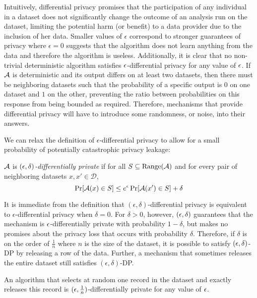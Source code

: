 Intuitively, differential privacy promises that the participation of any individual in a dataset does not significantly change the outcome of an analysis run on the dataset, limiting the potential harm (or benefit) to a data provider due to the inclusion of her data. Smaller values of $\epsilon$ correspond to stronger guarantees of privacy where $\epsilon = 0$ suggests that the algorithm does not learn anything from the data and therefore the algorithm is useless. Additionally, it is clear that no non-trivial deterministic algorithm satisfies $\epsilon$-differential privacy for any value of $\epsilon$. If $\mathcal{A}$ is deterministic and its output differs on at least two datasets, then there must be neighboring datasets such that the probability of a specific output is $0$ on one dataset and $1$ on the other, preventing the ratio between probabilities on this response from being bounded as required. Therefore, mechanisms that provide differential privacy will have to introduce some randomness, or noise, into their answers.

We can relax the definition of $\epsilon$-differential privacy to allow for a small probability of potentially catastrophic privacy leakage:

\begin{definition}
$\mathcal{A}$ is \emph{$(\epsilon, \delta)$-differentially private} if for all $S \subseteq \text{Range}(\mathcal{A})$ and for every pair of neighboring datasets $x, x' \in \mathcal{D}$,
\begin{equation*}
\Pr[\mathcal{A}(x) \in S] \leq e^{\epsilon} \Pr[\mathcal{A}(x') \in S] + \delta
\end{equation*}
\end{definition}

It is immediate from the definition that $(\epsilon, \delta)$-differential privacy is equivalent to $\epsilon$-differential privacy  when $\delta = 0$. For $\delta > 0$,  however, $(\epsilon, \delta)$ guarantees that the mechanism is $\epsilon$-differentially private with probability $1-\delta$, but makes no promises about the privacy loss that occurs with probability $\delta$. Therefore, if $\delta$ is on the order of $\frac{1}{n}$ where $n$ is the size of the dataset, it is possible to satisfy $(\epsilon, \delta)$-DP by releasing a row of the data. Further, a mechanism that sometimes releases the entire dataset still satisfies $(\epsilon, \delta)$-DP.

\begin{example}
	\label{ex:bad_delta1}
	An algorithm that selects at random one record in the dataset and exactly releases this record is $(\epsilon, \frac{1}{n})$-differentially private for any value of $\epsilon$.
\end{example}

